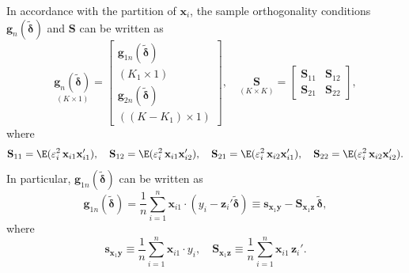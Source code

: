 In accordance with the partition of $\mathbf{x}_i$, the sample orthogonality conditions
$\mathbf{g}_n(\tilde{\boldsymbol{\delta}})$ and $\mathbf{S}$ can be written as
\begin{equation}
  \underset{(K \times 1)}{\mathbf{g}_n(\tilde{\boldsymbol{\delta}})}
  = \begin{bmatrix}
      \mathbf{g}_{1n}(\tilde{\boldsymbol{\delta}}) \\[-2pt]
      {\scriptstyle (K_1 \times 1)} \\[4pt]
      \mathbf{g}_{2n}(\tilde{\boldsymbol{\delta}}) \\[-2pt]
      {\scriptstyle ((K - K_1) \times 1)}
    \end{bmatrix}, \quad
  \underset{(K \times K)}{\mathbf{S}}
  = \begin{bmatrix}
      \mathbf{S}_{11} & \mathbf{S}_{12} \\
      \mathbf{S}_{21} & \mathbf{S}_{22}
    \end{bmatrix},
  \label{eq:3.6.5}
\end{equation}
where
\[
  \mathbf{S}_{11} = \E(\varepsilon_i^2\, \mathbf{x}_{i1} \mathbf{x}_{i1}'), \quad
  \mathbf{S}_{12} = \E(\varepsilon_i^2\, \mathbf{x}_{i1} \mathbf{x}_{i2}'), \quad
  \mathbf{S}_{21} = \E(\varepsilon_i^2\, \mathbf{x}_{i2} \mathbf{x}_{i1}'), \quad
  \mathbf{S}_{22} = \E(\varepsilon_i^2\, \mathbf{x}_{i2} \mathbf{x}_{i2}').
\]
In particular, $\mathbf{g}_{1n}(\tilde{\boldsymbol{\delta}})$ can be written as
\[
  \mathbf{g}_{1n}(\tilde{\boldsymbol{\delta}})
  = \frac{1}{n} \sum_{i=1}^{n} \mathbf{x}_{i1} \cdot
    (y_i - \mathbf{z}_i' \tilde{\boldsymbol{\delta}})
  \equiv \mathbf{s}_{\mathbf{x}_1 \mathbf{y}}
  - \mathbf{S}_{\mathbf{x}_1 \mathbf{z}}\, \tilde{\boldsymbol{\delta}},
\]
where
\begin{equation}
  \mathbf{s}_{\mathbf{x}_1 \mathbf{y}}
  \equiv \frac{1}{n} \sum_{i=1}^{n} \mathbf{x}_{i1} \cdot y_i, \quad
  \mathbf{S}_{\mathbf{x}_1 \mathbf{z}}
  \equiv \frac{1}{n} \sum_{i=1}^{n} \mathbf{x}_{i1}\, \mathbf{z}_i'.
  \label{eq:3.6.6}
\end{equation}

